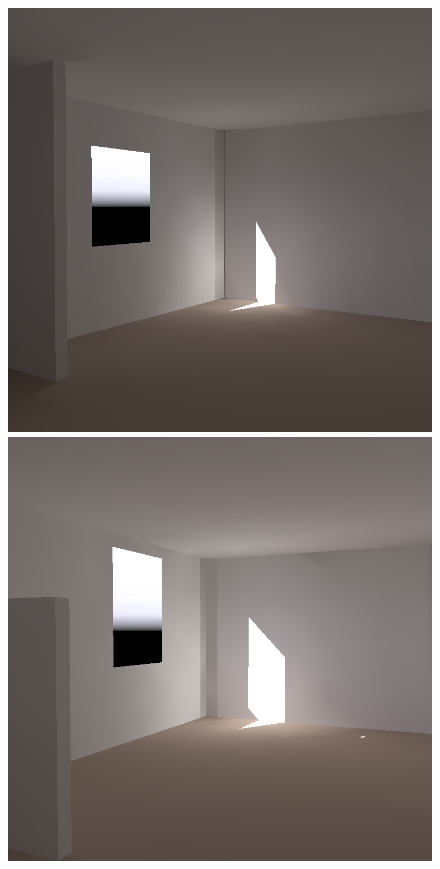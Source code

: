 \begin{figure}[t]
\begin{small}
\includegraphics[width=\figwidth]{p2r_070_camera_chris_march.png} \hfill        %
\includegraphics[width=\figwidth]{p2r_098_camera_chris_march.png} \hfill   %

\end{small}
\end{figure}
